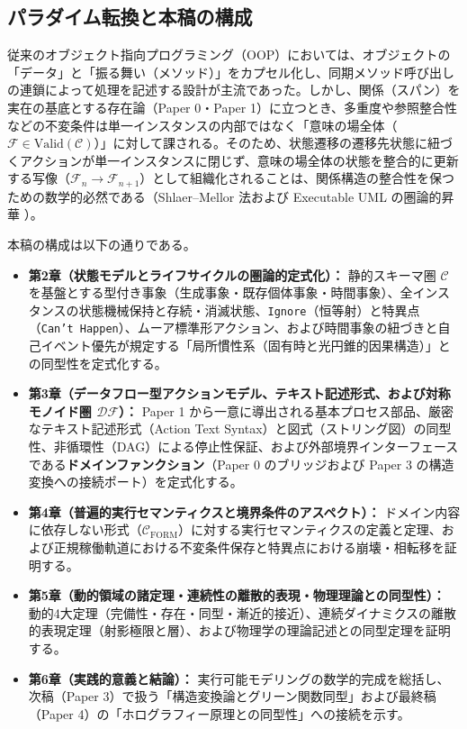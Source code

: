 \documentclass[11pt,a4paper]{ltjsarticle}
\theoremstyle{definition}
\theoremstyle{plain}
\theoremstyle{remark}
\newcommand{\Valid}{\mathrm{Valid}}
\newcommand{\DF}{\mathcal{DF}}
\newcommand{\Cform}{\mathcal{C}_{\mathrm{FORM}}}
\begin{document}
\subsection{パラダイム転換と本稿の構成}
従来のオブジェクト指向プログラミング（OOP）においては、オブジェクトの「データ」と「振る舞い（メソッド）」をカプセル化し、同期メソッド呼び出しの連鎖によって処理を記述する設計が主流であった。しかし、関係（スパン）を実在の基底とする存在論（Paper 0・Paper 1）に立つとき、多重度や参照整合性などの不変条件は単一インスタンスの内部ではなく「意味の場全体（$\mathcal{F} \in \Valid(\mathcal{C})$）」に対して課される。そのため、状態遷移の遷移先状態に紐づくアクションが単一インスタンスに閉じず、意味の場全体の状態を整合的に更新する写像（$\mathcal{F}_n \to \mathcal{F}_{n+1}$）として組織化されることは、関係構造の整合性を保つための数学的必然である（Shlaer--Mellor 法および Executable UML の圏論的昇華 \cite{shlaer1992,mellor2002,starr2001}）。

本稿の構成は以下の通りである。
\begin{itemize}
    \item \textbf{第2章（状態モデルとライフサイクルの圏論的定式化）：} 静的スキーマ圏 $\mathcal{C}$ を基盤とする型付き事象（生成事象・既存個体事象・時間事象）、全インスタンスの状態機械保持と存続・消滅状態、\texttt{Ignore}（恒等射）と特異点（\texttt{Can't Happen}）、ムーア標準形アクション、および時間事象の紐づきと自己イベント優先が規定する「局所慣性系（固有時と光円錐的因果構造）」との同型性を定式化する。
    \item \textbf{第3章（データフロー型アクションモデル、テキスト記述形式、および対称モノイド圏 $\DF$）：} Paper 1 から一意に導出される基本プロセス部品、厳密なテキスト記述形式（Action Text Syntax）と図式（ストリング図）の同型性、非循環性（DAG）による停止性保証、および外部境界インターフェースである\textbf{ドメインファンクション}（Paper 0 のブリッジおよび Paper 3 の構造変換への接続ポート）を定式化する。
    \item \textbf{第4章（普遍的実行セマンティクスと境界条件のアスペクト）：} ドメイン内容に依存しない形式（$\Cform$）に対する実行セマンティクスの定義と定理、および正規稼働軌道における不変条件保存と特異点における崩壊・相転移を証明する。
    \item \textbf{第5章（動的領域の諸定理・連続性の離散的表現・物理理論との同型性）：} 動的4大定理（完備性・存在・同型・漸近的接近）、連続ダイナミクスの離散的表現定理（射影極限と層）、および物理学の理論記述との同型定理を証明する。
    \item \textbf{第6章（実践的意義と結論）：} 実行可能モデリングの数学的完成を総括し、次稿（Paper 3）で扱う「構造変換論とグリーン関数同型」および最終稿（Paper 4）の「ホログラフィー原理との同型性」への接続を示す。
\end{itemize}
\end{document}
